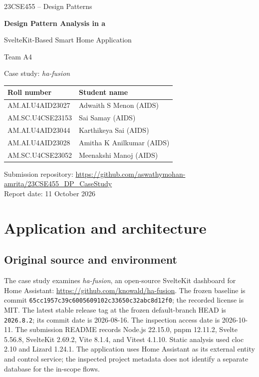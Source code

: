 \documentclass[11pt,a4paper]{article}
\newcommand{\code}[1]{\texttt{\small #1}}
\begin{document}
\begin{titlepage}
\centering
{\Large 23CSE455 -- Design Patterns\par}
\vspace{12mm}
{\huge\bfseries Design Pattern Analysis in a\par SvelteKit-Based Smart Home Application\par}
\vspace{8mm}
{\Large Team A4\par}
\vspace{4mm}
{\large Case study: \textit{ha-fusion}\par}
\vfill
\begin{tabular}{ll}
\toprule
Roll number & Student name \\
\midrule
AM.AI.U4AID23027 & Adwaith S Menon (AIDS) \\
AM.SC.U4CSE23153 & Sai Samay (AIDS) \\
AM.AI.U4AID23044 & Karthikeya Sai (AIDS) \\
AM.AI.U4AID23028 & Amitha K Anilkumar (AIDS) \\
AM.SC.U4CSE23052 & Meenakshi Manoj (AIDS) \\
\bottomrule
\end{tabular}

\vspace{4mm}
\vfill
Submission repository: \url{https://github.com/aswathymohan-amrita/23CSE455_DP_CaseStudy}\\
Report date: 11 October 2026
\end{titlepage}

\tableofcontents
\newpage

\section{Application and architecture}
\subsection{Original source and environment}
The case study examines \textit{ha-fusion}, an open-source SvelteKit dashboard
for Home Assistant: \url{https://github.com/knowald/ha-fusion}. The frozen
baseline is commit \code{65cc1957c39c6005609102c33650c32abc8d12f0}; the recorded
license is MIT. The latest stable release tag at the frozen default-branch
HEAD is \code{2026.8.2}; its commit date is 2026-08-16. The inspection access
date is 2026-10-11. The submission
README records Node.js 22.15.0, pnpm 12.11.2, Svelte 5.56.8, SvelteKit 2.69.2,
Vite 8.1.4, and Vitest 4.1.10. Static analysis used cloc 2.10 and Lizard
1.24.1. The application uses Home Assistant as its external entity and control
service; the inspected project metadata does not identify a separate database
for the in-scope flows.
\end{document}
